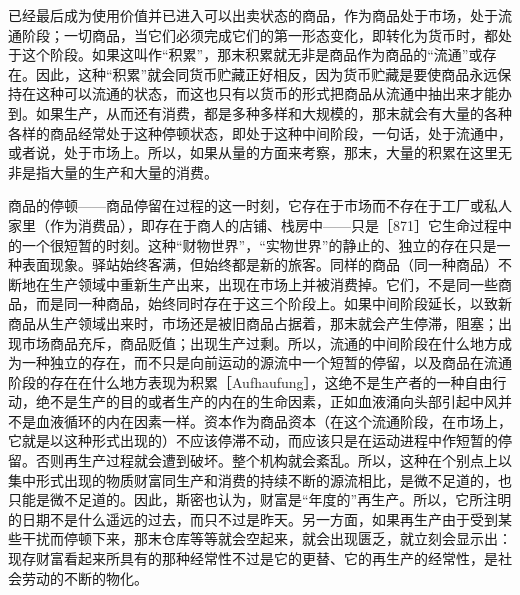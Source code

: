 已经最后成为使用价值并已进入可以出卖状态的商品，作为商品处于市场，处于流通阶段；一切商品，当它们必须完成它们的第一形态变化，即转化为货币时，都处于这个阶段。如果这叫作“积累”，那末积累就无非是商品作为商品的“流通”或存在。因此，这种“积累”就会同货币贮藏正好相反，因为货币贮藏是要使商品永远保持在这种可以流通的状态，而这也只有以货币的形式把商品从流通中抽出来才能办到。如果生产，从而还有消费，都是多种多样和大规模的，那末就会有大量的各种各样的商品经常处于这种停顿状态，即处于这种中间阶段，一句话，处于流通中，或者说，处于市场上。所以，如果从量的方面来考察，那末，大量的积累在这里无非是指大量的生产和大量的消费。

商品的停顿——商品停留在过程的这一时刻，它存在于市场而不存在于工厂或私人家里（作为消费品），即存在于商人的店铺、栈房中——只是［871］它生命过程中的一个很短暂的时刻。这种“财物世界”，“实物世界”的静止的、独立的存在只是一种表面现象。驿站始终客满，但始终都是新的旅客。同样的商品（同一种商品）不断地在生产领域中重新生产出来，出现在市场上并被消费掉。它们，不是同一些商品，而是同一种商品，始终同时存在于这三个阶段上。如果中间阶段延长，以致新商品从生产领域出来时，市场还是被旧商品占据着，那末就会产生停滞，阻塞；出现市场商品充斥，商品贬值；出现生产过剩。所以，流通的中间阶段在什么地方成为一种独立的存在，而不只是向前运动的源流中一个短暂的停留，以及商品在流通阶段的存在在什么地方表现为积累［Aufhaufung］，这绝不是生产者的一种自由行动，绝不是生产的目的或者生产的内在的生命因素，正如血液涌向头部引起中风并不是血液循环的内在因素一样。资本作为商品资本（在这个流通阶段，在市场上，它就是以这种形式出现的）不应该停滞不动，而应该只是在运动进程中作短暂的停留。否则再生产过程就会遭到破坏。整个机构就会紊乱。所以，这种在个别点上以集中形式出现的物质财富同生产和消费的持续不断的源流相比，是微不足道的，也只能是微不足道的。因此，斯密也认为，财富是“年度的”再生产。所以，它所注明的日期不是什么遥远的过去，而只不过是昨天。另一方面，如果再生产由于受到某些干扰而停顿下来，那末仓库等等就会空起来，就会出现匮乏，就立刻会显示出：现存财富看起来所具有的那种经常性不过是它的更替、它的再生产的经常性，是社会劳动的不断的物化。

